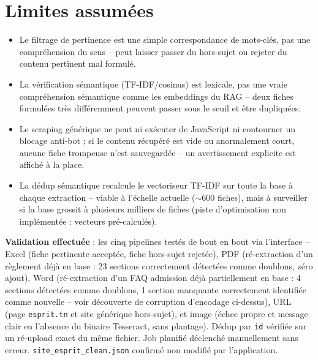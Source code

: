 \documentclass[11pt,a4paper]{report}
\begin{document}
\section{Limites assumées}
\begin{statutlimite}
\begin{itemize}
    \item Le filtrage de pertinence est une simple correspondance de mots-clés, pas une
    compréhension du sens -- peut laisser passer du hors-sujet ou rejeter du contenu
    pertinent mal formulé.
    \item La vérification sémantique (TF-IDF/cosinus) est lexicale, pas une vraie
    compréhension sémantique comme les embeddings du RAG -- deux fiches formulées très
    différemment peuvent passer sous le seuil et être dupliquées.
    \item Le scraping générique ne peut ni exécuter de JavaScript ni contourner un
    blocage anti-bot ; si le contenu récupéré est vide ou anormalement court, aucune
    fiche trompeuse n'est sauvegardée -- un avertissement explicite est affiché à la
    place.
    \item La dédup sémantique recalcule le vectoriseur TF-IDF sur toute la base à
    chaque extraction -- viable à l'échelle actuelle ($\sim$600 fiches), mais à
    surveiller si la base grossit à plusieurs milliers de fiches (piste
    d'optimisation non implémentée : vecteurs pré-calculés).
\end{itemize}
\end{statutlimite}

\begin{statutfait}
\textbf{Validation effectuée} : les cinq pipelines testés de bout en bout via
l'interface -- Excel (fiche pertinente acceptée, fiche hors-sujet rejetée), PDF
(ré-extraction d'un règlement déjà en base : 23 sections correctement détectées comme
doublons, zéro ajout), Word (ré-extraction d'un FAQ admission déjà partiellement en
base : 4 sections détectées comme doublons, 1 section manquante correctement identifiée
comme nouvelle -- voir découverte de corruption d'encodage ci-dessus), URL (page
\texttt{esprit.tn} et site générique hors-sujet), et image (échec propre et message
clair en l'absence du binaire Tesseract, sans plantage). Dédup par \texttt{id} vérifiée
sur un ré-upload exact du même fichier. Job planifié déclenché manuellement sans
erreur. \texttt{site\_esprit\_clean.json} confirmé non modifié par l'application.
\end{statutfait}
\end{document}
